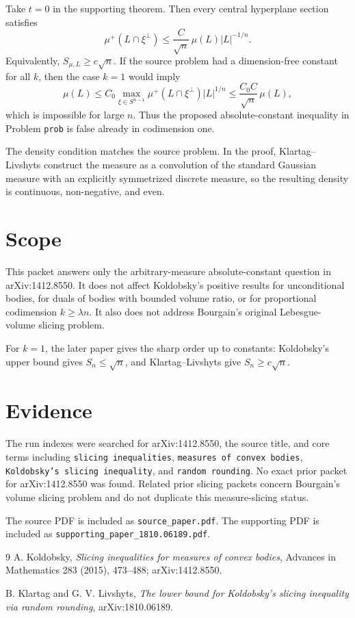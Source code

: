 \documentclass[11pt]{article}
\begin{document}
Take \(t=0\) in the supporting theorem. Then every central hyperplane section
satisfies
\[
  \mu^+(L\cap \xi^\perp)
  \leq
  \frac{C}{\sqrt n}\,\mu(L)|L|^{-1/n}.
\]
Equivalently, \(S_{\mu,L}\geq c\sqrt n\). If the source problem had a
dimension-free constant for all \(k\), then the case \(k=1\) would imply
\[
  \mu(L)
  \leq
  C_0 \max_{\xi\in S^{n-1}}
  \mu^+(L\cap \xi^\perp)|L|^{1/n}
  \leq
  \frac{C_0 C}{\sqrt n}\,\mu(L),
\]
which is impossible for large \(n\). Thus the proposed absolute-constant
inequality in Problem \texttt{prob} is false already in codimension one.

The density condition matches the source problem. In the proof,
Klartag--Livshyts construct the measure as a convolution of the standard
Gaussian measure with an explicitly symmetrized discrete measure, so the
resulting density is continuous, non-negative, and even.

\section*{Scope}

This packet answers only the arbitrary-measure absolute-constant question in
arXiv:1412.8550. It does not affect Koldobsky's positive results for
unconditional bodies, for duals of bodies with bounded volume ratio, or for
proportional codimension \(k\geq\lambda n\). It also does not address
Bourgain's original Lebesgue-volume slicing problem.

For \(k=1\), the later paper gives the sharp order up to constants:
Koldobsky's upper bound gives \(S_n\leq\sqrt n\), and Klartag--Livshyts give
\(S_n\geq c\sqrt n\).

\section*{Evidence}

The run indexes were searched for arXiv:1412.8550, the source title, and core
terms including \texttt{slicing inequalities}, \texttt{measures of convex
bodies}, \texttt{Koldobsky's slicing inequality}, and \texttt{random rounding}.
No exact prior packet for arXiv:1412.8550 was found. Related prior slicing
packets concern Bourgain's volume slicing problem and do not duplicate this
measure-slicing status.

The source PDF is included as \texttt{source\_paper.pdf}. The supporting PDF is
included as \texttt{supporting\_paper\_1810.06189.pdf}.

\begin{thebibliography}{9}
A. Koldobsky,
\emph{Slicing inequalities for measures of convex bodies},
Advances in Mathematics 283 (2015), 473--488; arXiv:1412.8550.

B. Klartag and G. V. Livshyts,
\emph{The lower bound for Koldobsky's slicing inequality via random rounding},
arXiv:1810.06189.
\end{thebibliography}
\end{document}
